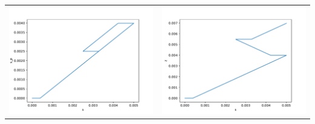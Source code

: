 \documentclass[main.tex]{subfiles}
\begin{document}
\begin{bmcsexample}
\begin{center}
\noindent
\begin{tabular}{L{7.5cm}L{7.5cm}}
\includegraphics[width=7.5cm]{examples/e22_bond_slip_plasticity_kinem/fig_s_p-s.pdf}
 & 
\includegraphics[width=7.5cm]{examples/e22_bond_slip_plasticity_kinem/fig_z-s.pdf}
 \\\end{tabular}
\end{center}
\end{bmcsexample}
\end{document}
